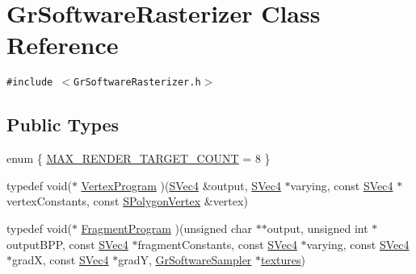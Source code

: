\hypertarget{class_gr_software_rasterizer}{
\section{GrSoftwareRasterizer Class Reference}
\label{class_gr_software_rasterizer}
}
{\tt \#include $<$GrSoftwareRasterizer.h$>$}

\subsection*{Public Types}
\begin{CompactItemize}
\item 
enum \{ \hyperlink{class_gr_software_rasterizer_b42d432567917cc2b4bc57cd96e5d7e349dc9744965746cb773cd7f159cb304d}{MAX\_\-RENDER\_\-TARGET\_\-COUNT} =  8
 \}
\item 
typedef void($\ast$ \hyperlink{class_gr_software_rasterizer_04030d2fb613d917866570b1150e208b}{VertexProgram} )(\hyperlink{struct_s_vec4}{SVec4} \&output, \hyperlink{struct_s_vec4}{SVec4} $\ast$varying, const \hyperlink{struct_s_vec4}{SVec4} $\ast$vertexConstants, const \hyperlink{struct_s_polygon_vertex}{SPolygonVertex} \&vertex)
\item 
typedef void($\ast$ \hyperlink{class_gr_software_rasterizer_391d569a4a93dabc37cdc787f11c2e9a}{FragmentProgram} )(unsigned char $\ast$$\ast$output, unsigned int $\ast$outputBPP, const \hyperlink{struct_s_vec4}{SVec4} $\ast$fragmentConstants, const \hyperlink{struct_s_vec4}{SVec4} $\ast$varying, const \hyperlink{struct_s_vec4}{SVec4} $\ast$gradX, const \hyperlink{struct_s_vec4}{SVec4} $\ast$gradY, \hyperlink{class_gr_software_sampler}{GrSoftwareSampler} $\ast$\hyperlink{glext__bak_8h_76454c03d9d5c83988eddfce6abb7059}{textures})

\end{CompactItemize}
